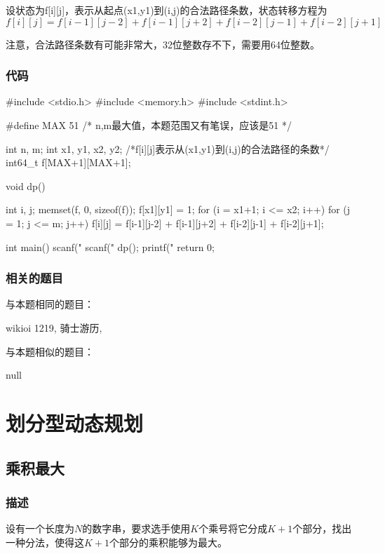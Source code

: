 设状态为f[i][j]，表示从起点(x1,y1)到(i,j)的合法路径条数，状态转移方程为
$$
f[i][j] = f[i-1][j-2] + f[i-1][j+2] + f[i-2][j-1] + f[i-2][j+1]
$$

注意，合法路径条数有可能非常大，32位整数存不下，需要用64位整数。

\subsubsection{代码}

\begin{Codex}[label=horse.c]
#include <stdio.h>
#include <memory.h>
#include <stdint.h>

#define MAX  51  /* n,m最大值，本题范围又有笔误，应该是51 */

int n, m;
int x1, y1, x2, y2;
/*f[i][j]表示从(x1,y1)到(i,j)的合法路径的条数*/
int64_t f[MAX+1][MAX+1];

void dp() {
    int i, j;
    memset(f, 0, sizeof(f));
    f[x1][y1] = 1;
    for (i = x1+1; i <= x2; i++) {
        for (j = 1; j <= m; j++) {
            f[i][j] = f[i-1][j-2] + f[i-1][j+2] + f[i-2][j-1] + f[i-2][j+1];
        }
    }

}

int main() {
    scanf("%
    scanf("%
    dp();
    printf("%
    return 0;
}
\end{Codex}

\subsubsection{相关的题目}
与本题相同的题目：
\begindot
\item wikioi 1219, 骑士游历, 
\myenddot

与本题相似的题目：
\begindot
\item  null
\myenddot


\section{划分型动态规划} %

\subsection{乘积最大}

\subsubsection{描述}
设有一个长度为$N$的数字串，要求选手使用$K$个乘号将它分成$K+1$个部分，找出一种分法，使得这$K+1$个部分的乘积能够为最大。

